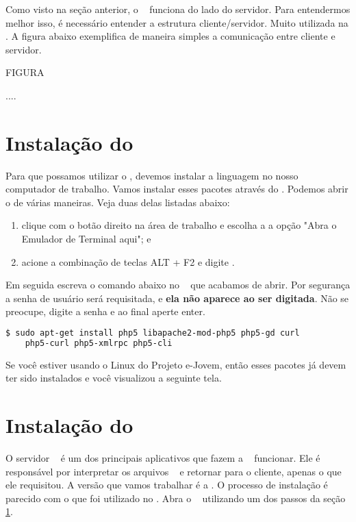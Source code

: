 Como visto na seção anterior, o \php~ funciona do lado do servidor. Para entendermos
melhor isso, é necessário entender a estrutura cliente/servidor. Muito utilizada
na \internet. A figura abaixo exemplifica de maneira simples a comunicação entre
cliente e servidor.

FIGURA

....

\section{Instalação do \php}
\label{instalacao-do-php}

Para que possamos utilizar o \php, devemos instalar a linguagem no nosso computador
de trabalho. Vamos instalar esses pacotes através do \terminal. Podemos abrir o
\terminal de várias maneiras. Veja duas delas listadas abaixo:

\begin{enumerate}
	\item clique com o botão direito na área de trabalho e escolha a a opção
	"Abra o Emulador de Terminal aqui"; e
	\item acione a combinação de teclas ALT + F2 e digite \xfceterminal.
\end{enumerate}

Em seguida escreva o comando abaixo no \terminal~ que acabamos de abrir. Por segurança
a senha de usuário será requisitada, e \textbf{ela não aparece ao ser digitada}.
Não se preocupe, digite a senha e ao final aperte enter. 

\begin{lstlisting}[language=bash, style=Comandos]
  $ sudo apt-get install php5 libapache2-mod-php5 php5-gd curl 
  	php5-curl php5-xmlrpc php5-cli
\end{lstlisting}

Se você estiver usando o Linux do Projeto e-Jovem, então esses pacotes já devem
ter sido instalados e você visualizou a seguinte tela.


\section{Instalação do \apache}
\label{instalacao-do-apache}

O servidor \apache~ é um dos principais aplicativos que fazem a \web~ funcionar.
Ele é responsável por interpretar os arquivos \phpextensao~ e retornar para o
cliente, apenas o que ele requisitou. A versão que vamos trabalhar é a \apacheversao.
O processo de instalação é parecido com o que foi utilizado no \php. Abra o
\terminal~ utilizando um dos passos da seção \ref{instalacao-do-php}.


